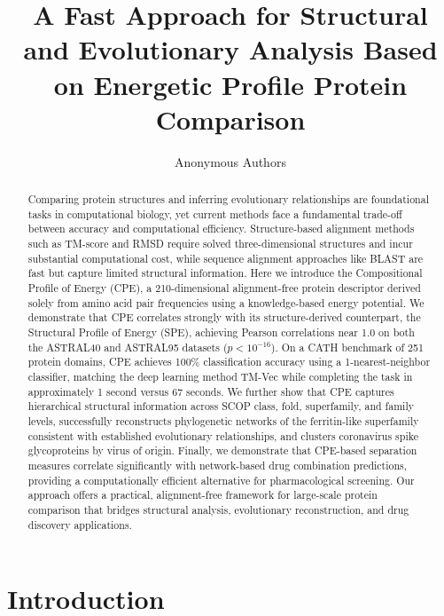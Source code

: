 \documentclass[11pt]{article}
\title{A Fast Approach for Structural and Evolutionary Analysis Based on Energetic Profile Protein Comparison}
\author{Anonymous Authors}
\date{}
\begin{document}
\maketitle

\begin{abstract}
Comparing protein structures and inferring evolutionary relationships are foundational tasks in computational biology, yet current methods face a fundamental trade-off between accuracy and computational efficiency. Structure-based alignment methods such as TM-score and RMSD require solved three-dimensional structures and incur substantial computational cost, while sequence alignment approaches like BLAST are fast but capture limited structural information. Here we introduce the Compositional Profile of Energy (CPE), a 210-dimensional alignment-free protein descriptor derived solely from amino acid pair frequencies using a knowledge-based energy potential. We demonstrate that CPE correlates strongly with its structure-derived counterpart, the Structural Profile of Energy (SPE), achieving Pearson correlations near 1.0 on both the ASTRAL40 and ASTRAL95 datasets ($p < 10^{-16}$). On a CATH benchmark of 251 protein domains, CPE achieves 100\% classification accuracy using a 1-nearest-neighbor classifier, matching the deep learning method TM-Vec while completing the task in approximately 1 second versus 67 seconds. We further show that CPE captures hierarchical structural information across SCOP class, fold, superfamily, and family levels, successfully reconstructs phylogenetic networks of the ferritin-like superfamily consistent with established evolutionary relationships, and clusters coronavirus spike glycoproteins by virus of origin. Finally, we demonstrate that CPE-based separation measures correlate significantly with network-based drug combination predictions, providing a computationally efficient alternative for pharmacological screening. Our approach offers a practical, alignment-free framework for large-scale protein comparison that bridges structural analysis, evolutionary reconstruction, and drug discovery applications.
\end{abstract}

\section{Introduction}
\end{document}
